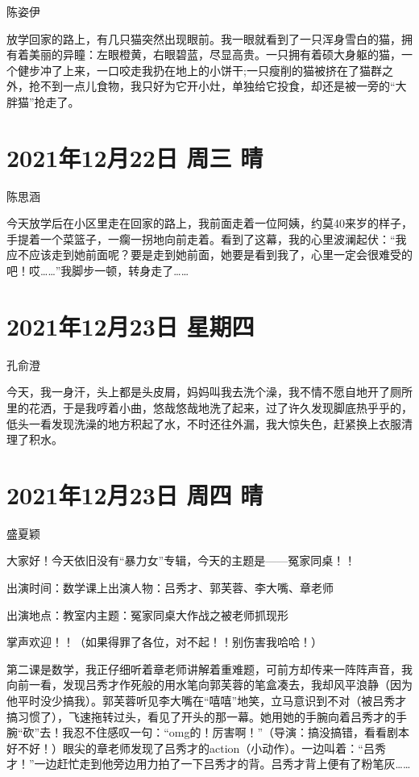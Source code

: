 陈姿伊

放学回家的路上，有几只猫突然出现眼前。我一眼就看到了一只浑身雪白的猫，拥有着美丽的异瞳：左眼橙黄，右眼碧蓝，尽显高贵。一只拥有着硕大身躯的猫，一个健步冲了上来，一口咬走我扔在地上的小饼干;一只瘦削的猫被挤在了猫群之外，抢不到一点儿食物，我只好为它开小灶，单独给它投食，却还是被一旁的“大胖猫”抢走了。

\section{2021年12月22日 周三 晴}

陈思涵

今天放学后在小区里走在回家的路上，我前面走着一位阿姨，约莫40来岁的样子，手提着一个菜篮子，一瘸一拐地向前走着。看到了这幕，我的心里波澜起伏：“我应不应该走到她前面呢？要是走到她前面，她要是看到我了，心里一定会很难受的吧！哎……”我脚步一顿，转身走了……

\section{2021年12月23日 星期四}

孔俞澄

今天，我一身汗，头上都是头皮屑，妈妈叫我去洗个澡，我不情不愿自地开了厕所里的花洒，于是我哼着小曲，悠哉悠哉地洗了起来，过了许久发现脚底热乎乎的，低头一看发现洗澡的地方积起了水，不时还往外漏，我大惊失色，赶紧换上衣服清理了积水。

\section{2021年12月23日 周四 晴}

盛夏颖

大家好！今天依旧没有“暴力女”专辑，今天的主题是——冤家同桌！！

出演时间：数学课上出演人物：吕秀才、郭芙蓉、李大嘴、章老师

出演地点：教室内主题：冤家同桌大作战之被老师抓现形

掌声欢迎！！（如果得罪了各位，对不起！！别伤害我哈哈！）

第二课是数学，我正仔细听着章老师讲解着重难题，可前方却传来一阵阵声音，我向前一看，发现吕秀才作死般的用水笔向郭芙蓉的笔盒凑去，我却风平浪静（因为他平时没少搞我）。郭芙蓉听见李大嘴在“嘻嘻”地笑，立马意识到不对（被吕秀才搞习惯了），飞速拖转过头，看见了开头的那一幕。她用她的手腕向着吕秀才的手腕“砍”去！我忍不住感叹一句：“omg的！厉害啊！”（导演：搞没搞错，看看剧本好不好！）眼尖的章老师发现了吕秀才的action（小动作）。一边叫着：“吕秀才！”一边赶忙走到他旁边用力拍了一下吕秀才的背。吕秀才背上便有了粉笔灰……


